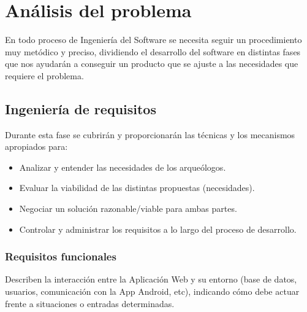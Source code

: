 \chapter{Análisis del problema}
 
En todo proceso de Ingeniería del Software se necesita seguir un procedimiento muy metódico
y preciso, dividiendo el desarrollo del software en distintas fases que nos ayudarán a
conseguir un producto que se ajuste a las necesidades que requiere el problema.

\section{Ingeniería de requisitos}
Durante esta fase se cubrirán y proporcionarán las técnicas y los mecanismos apropiados
para:

    \begin{itemize}
        \item Analizar y entender las necesidades de los arqueólogos.
        \item Evaluar la viabilidad de las distintas propuestas (necesidades).
        \item Negociar un solución razonable/viable para ambas partes.
        \item Controlar y administrar los requisitos a lo largo del proceso de desarrollo.
    \end{itemize}

\subsection{Requisitos funcionales}
Describen la interacción entre la Aplicación Web y su entorno (base de datos, usuarios, 
comunicación con la App Android, etc), indicando cómo debe actuar frente a situaciones o
entradas determinadas.

